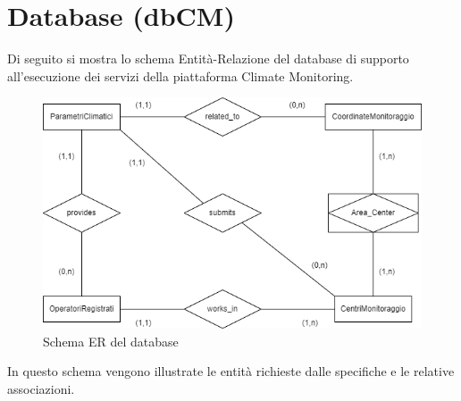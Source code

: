 \chapter{Database (dbCM)}
Di seguito si mostra lo schema Entità-Relazione del database di supporto all’esecuzione dei servizi della piattaforma Climate Monitoring.

\begin{figure}[h]
	\centering
	\caption{Schema ER del database}
	\label{fig:erdb}
	\includegraphics[width=0.8\linewidth]{../../fig/img/tecnico/ERdb.drawio}
\end{figure}

In questo schema vengono illustrate le entità richieste dalle specifiche e le relative associazioni.

